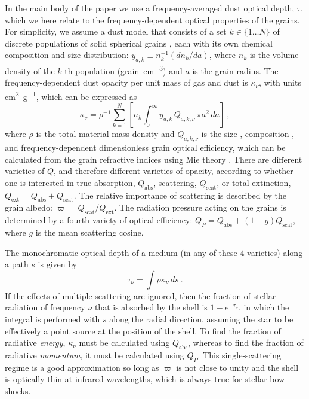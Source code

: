 \documentclass[useAMS, usenatbib, a4paper]{mnras}
\begin{document}
In the main body of the paper we use a frequency-averaged dust optical
depth, \(\tau\), which we here relate to the frequency-dependent optical
properties of the grains.  For simplicity, we assume a dust model that
consists of a set \(k \in \{1 \dots N\}\) of discrete populations of
solid spherical grains \citep[e.g.][]{Desert:1990a}, each with its own
chemical composition and size distribution:
\(y_{a,k} \equiv n_k^{-1} (d n_k / d a)\), where \(n_k\) is the volume
density of the \(k\)-th population (\si{grain.cm^{-3}}) and \(a\) is
the grain radius. The frequency-dependent dust opacity per unit mass
of gas and dust is \(\kappa_\nu\), with units \si{cm^2.g^{-1}}, which can be
expressed as
\begin{equation}
  \label{eq:dust-opacity-frequency}
  \kappa_\nu = \rho^{-1} \sum_{k=1}^{N} \left[  n_k \int_0^\infty \!\!y_{a,k} \, Q_{a,k,\nu} \,\pi a^2 \, da\right]\ ,
\end{equation}
where \(\rho\) is the total material mass density and \(Q_{a,k,\nu}\) is
the size-, composition-, and frequency-dependent dimensionless grain
optical efficiency, which can be calculated from the grain refractive
indices using Mie theory \citep{Bohren:1983a}.  There are different
varieties of \(Q\), and therefore different varieties of opacity,
according to whether one is interested in true absorption,
\(Q_{\text{abs}}\), scattering, \(Q_{\text{scat}}\), or total
extinction, \(Q_{\text{ext}} = Q_{\text{abs}} + Q_{\text{scat}}\).
The relative importance of scattering is described by the grain
albedo: \(\varpi = Q_{\text{scat}}/Q_{\text{ext}}\).  The radiation
pressure acting on the grains is determined by a fourth variety of
optical efficiency:
\(Q_P = Q_{\text{abs}} + (1 - g) Q_{\text{scat}}\), where \(g\) is the
mean scattering cosine.

The monochromatic optical depth of a medium (in any of these 4
varieties) along a path \(s\) is given by
\begin{equation}
  \label{eq:tau-monochromatic}
  \tau_\nu = \int \rho \kappa_\nu \, ds \ .
\end{equation}
If the effects of multiple scattering are ignored, then the fraction
of stellar radiation of frequency \(\nu\) that is absorbed by the shell
is \(1 - e^{-\tau_\nu}\), in which the integral is performed with
\(s\) along the radial direction, assuming the star to be effectively
a point source at the position of the shell.  To find the fraction of
radiative \emph{energy}, \(\kappa_\nu\) must be calculated using
\(Q_{\text{abs}}\), whereas to find the fraction of radiative
\emph{momentum}, it must be calculated using \(Q_P\).  This
single-scattering regime \citep[e.g.][]{Wibking:2018a} is a good
approximation so long as \(\varpi\) is not close to unity and the
shell is optically thin at infrared wavelengths, which is always true
for stellar bow shocks.
\end{document}
